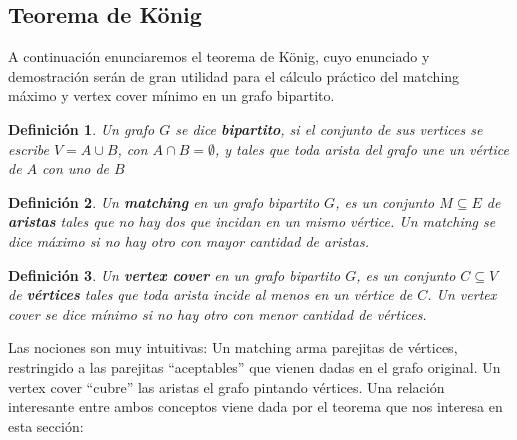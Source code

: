 \documentclass{article}
\newtheorem{definicion}{{\sc Definición}}
\begin{document}
\subsection{Teorema de König}

A continuación enunciaremos el teorema de König, cuyo enunciado y demostración serán de gran utilidad para el cálculo práctico del
matching máximo y vertex cover mínimo en un grafo bipartito.

\begin{definicion}
Un grafo $G$ se dice \textbf{bipartito}, si el conjunto de sus vertices se escribe $V = A \cup B$, con $A \cap B = \emptyset$, y tales que toda arista
del grafo une un vértice de $A$ con uno de $B$
\end{definicion}

\begin{definicion}
Un \textbf{matching} en un grafo bipartito $G$, es un conjunto $M \subseteq E$ de \textbf{aristas} tales que no hay dos que incidan en un mismo vértice.
Un matching se dice máximo si no hay otro con mayor cantidad de aristas.
\end{definicion}

\begin{definicion}
Un \textbf{vertex cover} en un grafo bipartito $G$, es un conjunto $C \subseteq V$ de \textbf{vértices} tales que toda arista incide al menos en
un vértice de $C$. Un vertex cover se dice mínimo si no hay otro con menor cantidad de vértices.
\end{definicion}

Las nociones son muy intuitivas: Un matching arma parejitas de vértices, restringido a las parejitas ``aceptables'' que vienen dadas en el grafo
original. Un vertex cover ``cubre'' las aristas el grafo pintando vértices. Una relación interesante entre ambos conceptos viene dada por el teorema
que nos interesa en esta sección:
\end{document}
